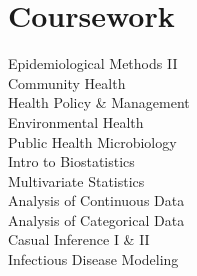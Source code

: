 \section{Coursework}
Epidemiological Methods II \\
Community Health \\
Health Policy \& Management \\
Environmental Health \\
Public Health Microbiology \\
Intro to Biostatistics\\
Multivariate Statistics\\
Analysis of Continuous Data\\
Analysis of Categorical Data\\
Casual Inference I \& II\\
Infectious Disease Modeling\\

\sectionsep